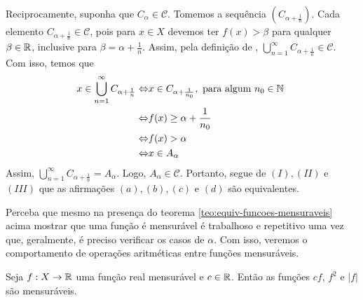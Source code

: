 \begin{prova}
Reciprocamente, suponha que $C_\alpha \in \mathcal{C}$. Tomemos a sequência $\left(C_{\alpha + \frac{1}{n}}\right)$.
Cada elemento $C_{\alpha +\frac{1}{n}} \in \mathcal{C}$, pois para $x \in X$ devemos ter $f(x) > \beta$ para qualquer $\beta \in \mathbb{R}$, inclusive para $\beta = \alpha + \frac{1}{n}$. Assim, pela definição de \sigal, 
$\displaystyle \bigcup_{n = 1}^\infty C_{\alpha +\frac{1}{n}} \in \mathcal{C}$. Com isso, temos que
\begin{align*}
    x \in \displaystyle \bigcup_{n = 1}^\infty C_{\alpha +\frac{1}{n}}
    \Leftrightarrow & x \in C_{\alpha + \frac{1}{n_0}}, \textrm{\ para algum  $n_0 \in \N$ }\\
    \Leftrightarrow & f(x)\geq \alpha +\dfrac{1}{n_0}\\
    \Leftrightarrow & f(x) > \alpha \\
    \Leftrightarrow & x \in A_\alpha
\end{align*}
Assim, $\displaystyle \bigcup_{n = 1}^\infty C_{\alpha +\frac{1}{n}} = A_\alpha$. Logo, $A_\alpha \in \mathcal{C}$.
Portanto, segue de $(I), (II)$ e $(III)$ que as afirmações $(a), (b), (c)$ e $(d)$ são equivalentes.


\end{prova}

Perceba que mesmo na presença do teorema \ref{teo:equiv-funcoes-mensuraveis} acima mostrar que uma função é mensurável é trabalhoso e repetitivo uma vez que, geralmente, é preciso verificar os casos de $\alpha$. Com isso, veremos o comportamento de operações aritméticas entre funções mensuráveis.

\begin{proposition}
\label{prop:aritmetica-uma-funcao}
Seja $f: X \to \mathbb{R}$ uma função real mensurável e $c \in \mathbb{R}$. Então as funções $cf$, $f^2$ e $|f|$ são mensuráveis. 
\end{proposition}

